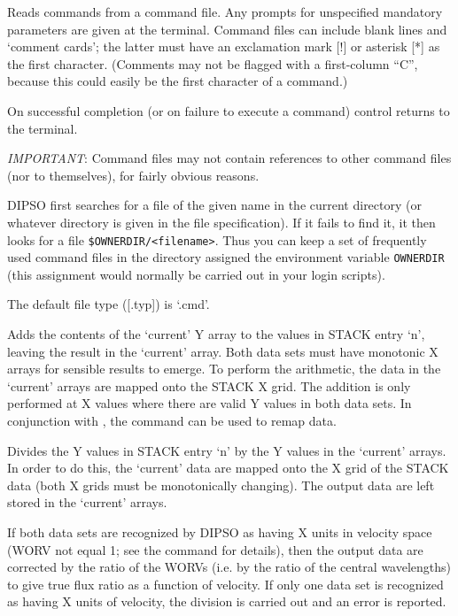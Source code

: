 \begin {description}

Reads commands from a command file. Any
prompts for unspecified mandatory parameters are given at the
terminal. Command files can include blank lines and `comment cards';
the latter must have an exclamation mark [!] or asterisk [*] as the
first character. (Comments may not be flagged with a first-column
``C'', because this could easily be the first character of a command.)

On successful completion (or on failure to execute a command) control
returns to the terminal.

{\em IMPORTANT}: Command files may not contain references to other
command files (nor to themselves), for fairly obvious reasons.

DIPSO first searches for a file of the given name in the current directory (or
whatever directory is given in the file specification). If it fails to find it,
it then looks for a file {\verb+$OWNERDIR/<filename>+}. Thus you can keep a set
of frequently used command files in the directory assigned the environment
variable {\tt{OWNERDIR}}  (this assignment would normally be carried
out in your login scripts).

The default file type ([.typ]) is `.cmd'.

Adds the contents of the `current' Y array to the values in STACK
entry `n', leaving the result in the `current' array. Both data sets
must have monotonic X arrays for sensible results to emerge. To
perform the arithmetic, the data in the `current' arrays are mapped
onto the STACK X grid. The addition is only performed at X values
where there are valid Y values in both data sets. In conjunction with
,  the   command can be used to remap data.

Divides the Y values in STACK entry `n' by the Y values in the
`current' arrays. In order to do this, the `current' data are mapped
onto the X grid of the STACK data (both X grids must be monotonically
changing). The output data are left stored in the `current' arrays.

If both data sets are recognized by DIPSO as having X units in velocity
space (WORV not equal 1; see the   command for details), then the
output data are corrected by the ratio of the WORVs (i.e. by the ratio
of the central wavelengths) to give true flux ratio as a function of
velocity. If only one data set is recognized as having X units of
velocity, the division is carried out and an error is reported.


\end{description}
